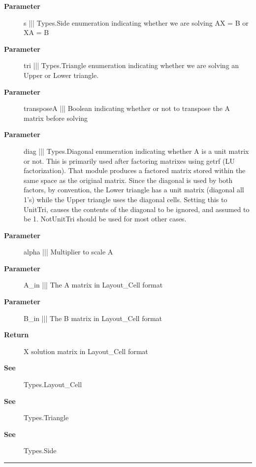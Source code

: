 \par
\begin{description}
\item [\textbf{Parameter}] s ||| Types.Side enumeration indicating whether we are solving AX = B or XA = B
\item [\textbf{Parameter}] tri ||| Types.Triangle enumeration indicating whether we are solving an Upper or Lower triangle.
\item [\textbf{Parameter}] transposeA ||| Boolean indicating whether or not to transpose the A matrix before solving
\item [\textbf{Parameter}] diag ||| Types.Diagonal enumeration indicating whether A is a unit matrix or not. This is primarily used after factoring matrixes using getrf (LU factorization). That module produces a factored matrix stored within the same space as the original matrix. Since the diagonal is used by both factors, by convention, the Lower triangle has a unit matrix (diagonal all 1's) while the Upper triangle uses the diagonal cells. Setting this to UnitTri, causes the contents of the diagonal to be ignored, and assumed to be 1. NotUnitTri should be used for most other cases.
\item [\textbf{Parameter}] alpha ||| Multiplier to scale A
\item [\textbf{Parameter}] A\_in ||| The A matrix in Layout\_Cell format
\item [\textbf{Parameter}] B\_in ||| The B matrix in Layout\_Cell format
\item [\textbf{Return}] X solution matrix in Layout\_Cell format
\item [\textbf{See}] Types.Layout\_Cell
\item [\textbf{See}] Types.Triangle
\item [\textbf{See}] Types.Side
\end{description}

\rule{\textwidth}{0.4pt}
